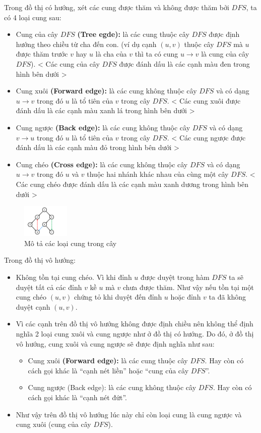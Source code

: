 \documentclass{article}
\begin{document}
Trong đồ thị có hướng, xét các cung được thăm và không được thăm bởi $DFS$, ta có 4 loại cung sau:
\begin{itemize}
    \item Cung của cây $DFS$ \textbf{(Tree egde):} là các cung thuộc cây $DFS$ được định hướng theo chiều từ cha đến con. (ví dụ cạnh $(u, v)$ thuộc cây $DFS$ mà $u$ được thăm trước $v$ hay $u$ là cha của $v$ thì ta có cung $u \rightarrow v$ là cung của cây $DFS$). < Các cung của cây $DFS$ được đánh dấu là các cạnh màu đen trong hình bên dưới >
    \item Cung xuôi \textbf{(Forward edge):} là các cung không thuộc cây $DFS$ và có dạng $u \rightarrow v$ trong đó $u$ là tổ tiên của $v$ trong cây $DFS$. < Các cung xuôi được đánh dấu là các cạnh màu xanh lá trong hình bên dưới >
    \item Cung ngược \textbf{(Back edge):} là các cung không thuộc cây $DFS$ và có dạng $v \rightarrow u$ trong đó $u$ là tổ tiên của $v$ trong cây $DFS$. < Các cung ngược được đánh dấu là các cạnh màu đỏ trong hình bên dưới >
    \item Cung chéo \textbf{(Cross edge):} là các cung không thuộc cây $DFS$ và có dạng $u \rightarrow v$ trong đó $u$ và $v$ thuộc hai nhánh khác nhau của cùng một cây $DFS$. < Các cung chéo được đánh dấu là các cạnh màu xanh dương trong hình bên dưới >
\end{itemize}

\begin{figure}[h]
    \centering
    \includegraphics[width=0.2\textwidth]{img/b3/Depth-First-Search-Tree_img2.png}   
    \caption{Mô tả các loại cung trong cây} 
\end{figure}


Trong đồ thị vô hướng:
\begin{itemize}
    \item Không tồn tại cung chéo. Vì khi đỉnh $u$ được duyệt trong hàm $DFS$ ta sẽ duyệt tất cả các đỉnh $v$ kề $u$ mà $v$ chưa được thăm. Như vậy nếu tồn tại một cung chéo $(u, v)$ chứng tỏ khi duyệt đến đỉnh $u$ hoặc đỉnh $v$ ta đã không duyệt cạnh $(u, v)$.
    \item Vì các cạnh trên đồ thị vô hướng không được định chiều nên không thể định nghĩa 2 loại cung xuôi và cung ngược như ở đồ thị có hướng. Do đó, ở đồ thị vô hướng, cung xuôi và cung ngược sẽ được định nghĩa như sau:
    \begin{itemize}
        \item Cung xuôi \textbf{(Forward edge):} là các cung thuộc cây $DFS$. Hay còn có cách gọi khác là ``cạnh nét liền'' hoặc ``cung của cây $DFS$''.
        \item Cung ngược (Back edge): là các cung không thuộc cây $DFS$. Hay còn có cách gọi khác là ``cạnh nét đứt''.
    \end{itemize}
    \item Như vậy trên đồ thị vô hướng lúc này chỉ còn  loại cung là cung ngược và cung xuôi (cung của cây $DFS$).
\end{itemize}
\end{document}
